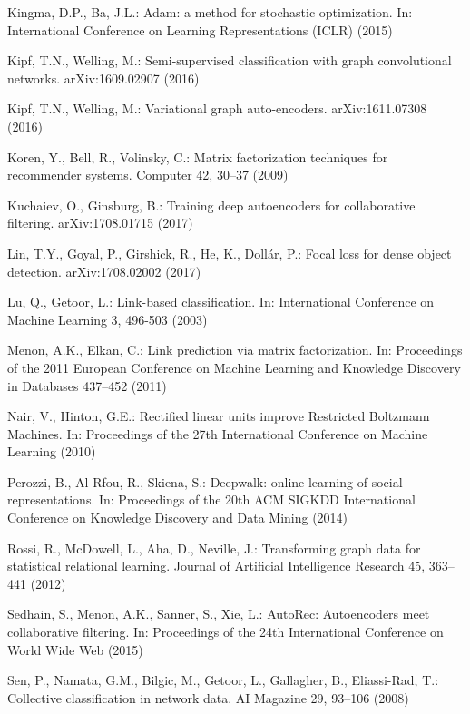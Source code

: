 \documentclass[letterpaper, conference]{IEEEtran}
\begin{document}
\begin{thebibliography}{99}
Kingma, D.P., Ba, J.L.:
Adam: a method for stochastic optimization.
In: International Conference on Learning Representations (ICLR) (2015)

Kipf, T.N., Welling, M.:
Semi-supervised classification with graph convolutional networks.
arXiv:1609.02907 (2016)

Kipf, T.N., Welling, M.:
Variational graph auto-encoders.
arXiv:1611.07308 (2016)

Koren, Y., Bell, R., Volinsky, C.:
Matrix factorization techniques for recommender systems.
Computer 42, 30--37 (2009)

Kuchaiev, O., Ginsburg, B.:
Training deep autoencoders for collaborative filtering.
arXiv:1708.01715 (2017)

Lin, T.Y., Goyal, P., Girshick, R., He, K., Doll{\'a}r, P.:
Focal loss for dense object detection.
arXiv:1708.02002 (2017)

Lu, Q., Getoor, L.:
Link-based classification.
In: International Conference on Machine Learning 3, 496-503 (2003)

Menon, A.K., Elkan, C.:
Link prediction via matrix factorization.
In: Proceedings of the 2011 European Conference on Machine Learning and Knowledge Discovery in Databases 437--452 (2011)

Nair, V., Hinton, G.E.:
Rectified linear units improve Restricted Boltzmann Machines.
In: Proceedings of the 27th International Conference on Machine Learning (2010)

Perozzi, B., Al-Rfou, R., Skiena, S.:
Deepwalk: online learning of social representations.
In: Proceedings of the 20th ACM SIGKDD International Conference on Knowledge Discovery and Data Mining (2014)

Rossi, R., McDowell, L., Aha, D., Neville, J.:
Transforming graph data for statistical relational learning.
Journal of Artificial Intelligence Research 45, 363--441 (2012)

Sedhain, S., Menon, A.K., Sanner, S., Xie, L.:
AutoRec: Autoencoders meet collaborative filtering.
In: Proceedings of the 24th International Conference on World Wide Web (2015)

Sen, P., Namata, G.M., Bilgic, M., Getoor, L., Gallagher, B., Eliassi-Rad, T.:
Collective classification in network data.
AI Magazine 29, 93--106 (2008)


\end{thebibliography}
\end{document}
